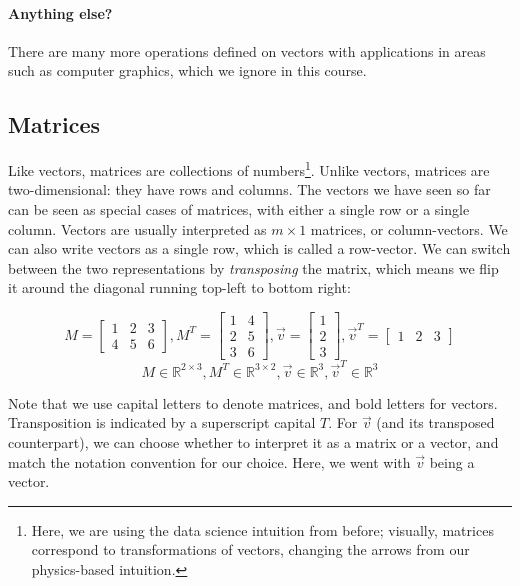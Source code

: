 \paragraph{Anything else?}
There are many more operations defined on vectors with applications in areas such as computer graphics, which we  ignore in this course.

\subsection{Matrices}
Like vectors, matrices are collections of numbers\footnote{Here, we are using the data science intuition from before; visually, matrices correspond to transformations of vectors, changing the arrows from our physics-based intuition.}. Unlike vectors, matrices are two-dimensional: they have rows and columns. The vectors we have seen so far can be seen as special cases of matrices, with either a single row or a single column. Vectors are usually interpreted as $m\times 1$ matrices, or column-vectors. We can also write vectors as a single row, which is called a row-vector. We can switch between the two representations by \emph{transposing} the matrix, which means we flip it around the diagonal running top-left to bottom right:

    \begin{equation*}
       M = \begin{bmatrix} 1 & 2 & 3 \\ 4 & 5 & 6 \end{bmatrix}, M^T = \begin{bmatrix} 1 & 4 \\ 2 & 5 \\ 3 & 6 \end{bmatrix}, \vec v = \begin{bmatrix} 1 \\ 2 \\ 3 \end{bmatrix}, \vec v ^ T = \begin{bmatrix} 1 & 2 & 3 \end{bmatrix}
    \end{equation*}
    \begin{equation*}
       M \in \mathbb{R}^{2\times 3}, M^T \in \mathbb{R}^{3\times 2}, \vec v \in \mathbb{R}^3, \vec v ^ T \in \mathbb{R}^3
    \end{equation*}

Note that we use capital letters to denote matrices, and bold letters for vectors. Transposition is indicated by a superscript capital $T$. For $\vec v$ (and its transposed counterpart), we can choose whether to interpret it as a matrix or a vector, and match the notation convention for our choice. Here, we went with $\vec v$ being a vector.

